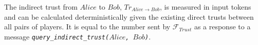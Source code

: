\begin{definition}
  The indirect trust from $Alice$ to $Bob$, $Tr_{Alice \rightarrow Bob}$, is measured in
  input tokens and can be calculated deterministically given the existing direct trusts
  between all pairs of players. It is equal to the number sent by $\mathcal{F}_{Trust}$ as
  a response to a message \emph{\texttt{query\_indirect\_trust(}$Alice$\texttt{,
  }$Bob$\texttt{)}}.
\end{definition}


